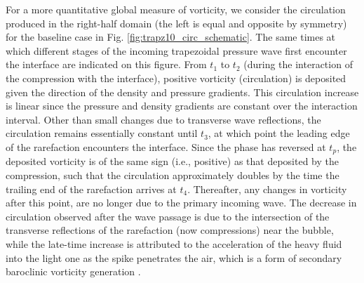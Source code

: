 \documentclass{jfm}%
\begin{document}
For a more quantitative global measure of vorticity, we consider the
circulation produced in the right-half domain (the left is equal and
opposite by symmetry) for the baseline case in Fig.
\ref{fig:trapz10_circ_schematic}. The same times at which different
stages of the incoming trapezoidal pressure wave first encounter the
interface are indicated on this figure. From $t_1$ to $t_2$ (during
the interaction of the compression with the interface), positive
vorticity (circulation) is deposited given the direction of the
density and pressure gradients. This circulation increase is linear
since the pressure and density gradients are constant over the
interaction interval. Other than small changes due to transverse wave
reflections, the circulation remains essentially constant until $t_3$,
at which point the leading edge of the rarefaction encounters the
interface. Since the phase has reversed at $t_p$, the deposited
vorticity is of the same sign (i.e., positive) as that deposited by
the compression, such that the circulation approximately doubles by
the time the trailing end of the rarefaction arrives at
$t_4$. Thereafter, any changes in vorticity after this point, are no longer due to the
primary incoming wave. The decrease in circulation observed after the
wave passage is due to the intersection of the transverse reflections
of the rarefaction (now compressions) near the bubble, while the
late-time increase is attributed to the acceleration of the heavy
fluid into the light one as the spike penetrates the air, which is a
form of secondary baroclinic vorticity generation \citep{Peng2003}.
\end{document}
